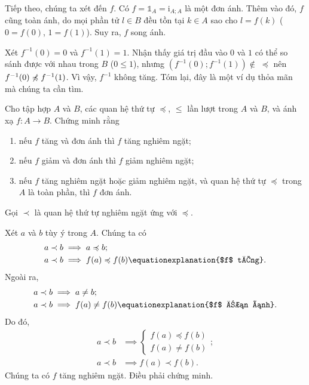 Tiếp theo, chúng ta xét đến $f$. Có $f = \mathds{1}_A = \mathrm{i}_{A;A}$ là một đơn ánh. Thêm vào đó, $f$ cũng toàn ánh, do mọi phần tử $l \in B$ đều tồn tại $k \in A$ sao cho $l = f(k)$ ($0 = f(0)$, $1 = f(1)$). Suy ra, $f$ song ánh.

Xét $f^{-1}(0) = 0$ và $f^{-1}(1) = 1$. Nhận thấy giá trị đầu vào $0$ và $1$ có thể so sánh được với nhau trong $B$ ($0 \leq 1$), nhưng $\left(f^{-1}(0); f^{-1}(1)\right) \notin \; \preccurlyeq$ nên $f^{-1}(0) \centernot{\preccurlyeq} f^{-1}(1)$. Vì vậy, $f^{-1}$ không tăng. Tóm lại, đây là một ví dụ thỏa mãn mà chúng ta cần tìm.

\exercise Cho tập hợp $A$ và $B$, các quan hệ thứ tự $\preccurlyeq$, $\leq$ lần lượt trong $A$ và $B$, và ánh xạ $f: A \to B$. Chứng minh rằng
\begin{enumerate}
   \item nếu $f$ tăng và đơn ánh thì $f$ tăng nghiêm ngặt;
   \item nếu $f$ giảm và đơn ánh thì $f$ giảm nghiêm ngặt;
   \item nếu $f$ tăng nghiêm ngặt hoặc giảm nghiêm ngặt, và quan hệ thứ tự $\preccurlyeq$ trong $A$ là toàn phần, thì $f$ đơn ánh.
\end{enumerate}

\solution 

Gọi $\prec$ là quan hệ thứ tự nghiêm ngặt ứng với $\preccurlyeq$.

\resetSubexercise Xét $a$ và $b$ tùy ý trong $A$. Chúng ta có 
\begin{align*}
   a \prec b &\implies a \preccurlyeq b; \\
   a \prec b &\implies f(a) \preccurlyeq f(b) \equationexplanation{$f$ tăng}.
\end{align*}
Ngoài ra, 
\begin{align*}
   a \prec b &\implies a \neq b; \\
   a \prec b &\implies f(a) \neq f(b) \equationexplanation{$f$ đơn ánh}.
\end{align*}
Do đó, \begin{align*}
   a \prec b &\implies \begin{cases}
      f(a) \preccurlyeq f(b) \\
      f(a) \neq f(b) 
   \end{cases}; \\
   a \prec b &\implies f(a) \prec f(b).
\end{align*}
Chúng ta có $f$ tăng nghiêm ngặt. Điều phải chứng minh.

